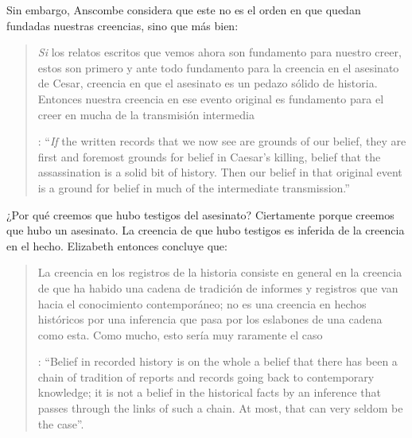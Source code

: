 \label{subsec:notchain}
Sin embargo, Anscombe considera que este no es el orden en que quedan fundadas nuestras creencias, sino que más bien: \blockquote[{\Cite[88]{anscombe1981parmenides:humeandjulius}}: \enquote{\emph{If} the written records that we now see are grounds of our belief, they are first and foremost grounds for belief in Caesar's killing, belief that the assassination is a solid bit of history. Then our belief in that original event is a ground for belief in much of the intermediate transmission.}]{\emph{Si} los relatos escritos que vemos ahora son fundamento para nuestro creer, estos son primero y ante todo fundamento para la creencia en el asesinato de Cesar, creencia en que el asesinato es un pedazo sólido de historia. Entonces nuestra creencia en ese evento original es fundamento para el creer en mucha de la transmisión intermedia}. ¿Por qué creemos que hubo testigos del asesinato? Ciertamente porque creemos que hubo un asesinato. La creencia de que hubo testigos es inferida de la creencia en el hecho.
Elizabeth entonces concluye que: \blockquote[{\Cite[89]{anscombe1981parmenides:humeandjulius}}: \enquote{Belief in recorded history is on the whole a belief that there has been a chain of tradition of reports and records going back to contemporary knowledge; it is not a belief in the historical facts by an inference that passes through the links of such a chain. At most, that can very seldom be the case}.]{La creencia en los registros de la historia consiste en general en la creencia de que ha habido una cadena de tradición de informes y registros que van hacia el conocimiento contemporáneo; no es una creencia en hechos históricos por una inferencia que pasa por los eslabones de una cadena como esta. Como mucho, esto sería muy raramente el caso}.



